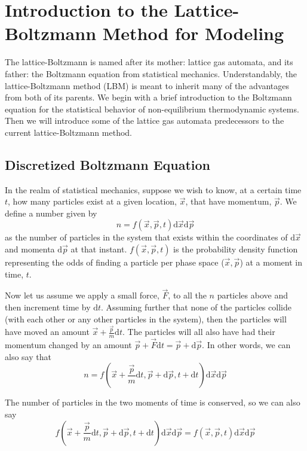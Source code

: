 \section{Introduction to the Lattice-Boltzmann Method for Modeling}\label{sec:lbm-intro}

The lattice-Boltzmann is named after its mother: lattice gas automata, and its father: the Boltzmann equation from statistical mechanics. Understandably, the lattice-Boltzmann method (LBM) is meant to inherit many of the advantages from both of its parents. We begin with a brief introduction to the Boltzmann equation for the statistical behavior of non-equilibrium thermodynamic systems. Then we will introduce some of the lattice gas automata predecessors to the current lattice-Boltzmann method.

\subsection{Discretized Boltzmann Equation}

In the realm of statistical mechanics, suppose we wish to know, at a certain time $t$, how many particles exist at a given location, $\vec{x}$, that have momentum, $\vec{p}$. We define a number given by
\begin{equation}
	n = f(\vec{x},\vec{p},t)\mathrm{d}\vec{x}\mathrm{d}\vec{p}
\end{equation}
as the number of particles in the system that exists within the coordinates of $\mathrm{d}\vec{x}$ and momenta $\mathrm{d}\vec{p}$ at that instant. $f(\vec{x},\vec{p},t)$ is the probability density function representing the odds of finding a particle per phase space ($\vec{x},\vec{p}$) at a moment in time, $t$.

Now let us assume we apply a small force, $\vec{F}$, to all the $n$ particles above and then increment time by $\mathrm{d}t$. Assuming further that none of the particles collide (with each other or any other particles in the system), then the particles will have moved an amount $\vec{x} + \frac{\vec{p}}{m}\mathrm{d}t$. The particles will all also have had their momentum changed by an amount $\vec{p} + \vec{F}\mathrm{d}t = \vec{p} + \mathrm{d}\vec{p}$. In other words, we can also say that 
\begin{equation}
 	n = f(\vec{x} + \frac{\vec{p}}{m}\mathrm{d}t,\vec{p} + \mathrm{d}\vec{p},t + \mathrm{d}t)\mathrm{d}\vec{x}\mathrm{d}\vec{p}
 \end{equation}

The number of particles in the two moments of time is conserved, so we can also say
\begin{equation}
	f(\vec{x} + \frac{\vec{p}}{m}\mathrm{d}t,\vec{p} + \mathrm{d}\vec{p},t + \mathrm{d}t)\mathrm{d}\vec{x}\mathrm{d}\vec{p} = f(\vec{x},\vec{p},t)\mathrm{d}\vec{x}\mathrm{d}\vec{p}
\end{equation}

